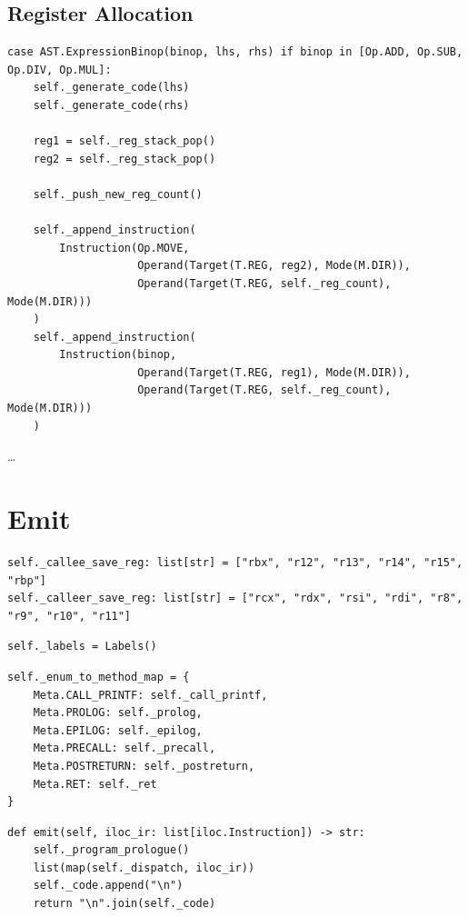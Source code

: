 \subsection{Register Allocation}
\begin{verbatim}
case AST.ExpressionBinop(binop, lhs, rhs) if binop in [Op.ADD, Op.SUB, Op.DIV, Op.MUL]:
    self._generate_code(lhs)
    self._generate_code(rhs)

    reg1 = self._reg_stack_pop()
    reg2 = self._reg_stack_pop()

    self._push_new_reg_count()

    self._append_instruction(
        Instruction(Op.MOVE,
                    Operand(Target(T.REG, reg2), Mode(M.DIR)),
                    Operand(Target(T.REG, self._reg_count), Mode(M.DIR)))
    )
    self._append_instruction(
        Instruction(binop,
                    Operand(Target(T.REG, reg1), Mode(M.DIR)),
                    Operand(Target(T.REG, self._reg_count), Mode(M.DIR)))
    )
\end{verbatim}

\ldots{}

\newpage

\section{Emit}

\begin{verbatim}
self._callee_save_reg: list[str] = ["rbx", "r12", "r13", "r14", "r15", "rbp"]
self._calleer_save_reg: list[str] = ["rcx", "rdx", "rsi", "rdi", "r8", "r9", "r10", "r11"]
\end{verbatim}

\begin{verbatim}
self._labels = Labels()
\end{verbatim}

\begin{verbatim}
self._enum_to_method_map = {
    Meta.CALL_PRINTF: self._call_printf,
    Meta.PROLOG: self._prolog,
    Meta.EPILOG: self._epilog,
    Meta.PRECALL: self._precall,
    Meta.POSTRETURN: self._postreturn,
    Meta.RET: self._ret
}
\end{verbatim}

\begin{verbatim}
def emit(self, iloc_ir: list[iloc.Instruction]) -> str:
    self._program_prologue()
    list(map(self._dispatch, iloc_ir))
    self._code.append("\n")
    return "\n".join(self._code)
\end{verbatim}

